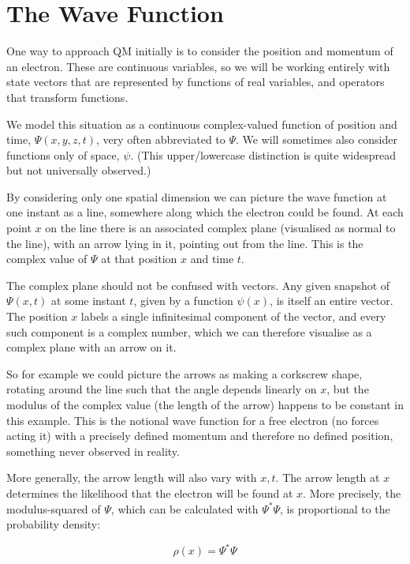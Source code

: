 \section{The Wave Function}

One way to approach QM initially is to consider the position and momentum of an electron. These are continuous variables, so we will be working entirely with state vectors that are represented by functions of real variables, and operators that transform functions.

We model this situation as a continuous complex-valued function of position and time, $\Psi(x, y, z, t)$, very often abbreviated to $\Psi$. We will sometimes also consider functions only of space, $\psi$. (This upper/lowercase distinction is quite widespread but not universally observed.)

By considering only one spatial dimension we can picture the wave function at one instant as a line, somewhere along which the electron could be found. At each point $x$ on the line there is an associated complex plane (visualised as normal to the line), with an arrow lying in it, pointing out from the line. This is the complex value of $\Psi$ at that position $x$ and time $t$.

The complex plane should not be confused with vectors. Any given snapshot of $\Psi(x, t)$ at some instant $t$, given by a function $\psi(x)$, is itself an entire vector. The position $x$ labels a single infinitesimal component of the vector, and every such component is a complex number, which we can therefore visualise as a complex plane with an arrow on it.

So for example we could picture the arrows as making a corkscrew shape, rotating around the line such that the angle depends linearly on $x$, but the modulus of the complex value (the length of the arrow) happens to be constant in this example. This is the notional wave function for a free electron (no forces acting it) with a precisely defined momentum and therefore no defined position, something never observed in reality.

More generally, the arrow length will also vary with $x, t$. The arrow length at $x$ determines the likelihood that the electron will be found at $x$. More precisely, the modulus-squared of $\Psi$, which can be calculated with $\Psi^*\Psi$, is proportional to the probability density:

\begin{equation}
  \rho(x) = \Psi^*\Psi
  \label{eqn:pdf}
\end{equation}

